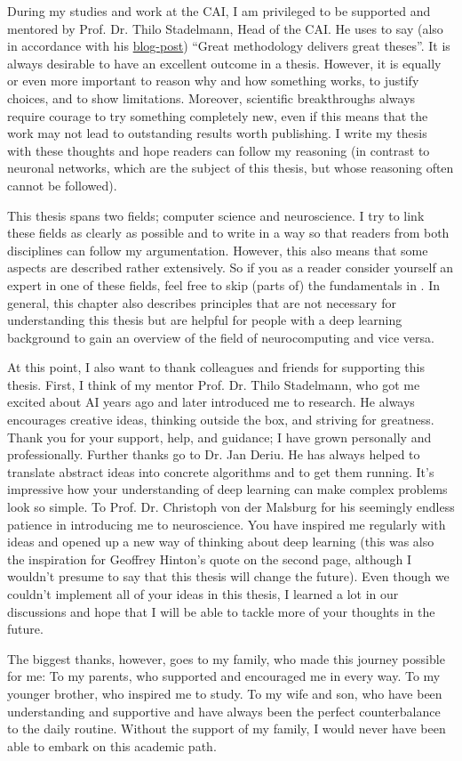 During my studies and work at the CAI, I am privileged to be supported and mentored by Prof. Dr. Thilo Stadelmann, Head of the CAI.
He uses to say (also in accordance with his \href{https://stdm.github.io/Great-methodology-delivers-great-theses/}{blog-post}) ``Great methodology delivers great theses''.
It is always desirable to have an excellent outcome in a thesis.
However, it is equally or even more important to reason why and how something works, to justify choices, and to show limitations.
Moreover, scientific breakthroughs always require courage to try something completely new, even if this means that the work may not lead to outstanding results worth publishing.
I write my thesis with these thoughts and hope readers can follow my reasoning (in contrast to neuronal networks, which are the subject of this thesis, but whose reasoning often cannot be followed).

This thesis spans two fields; computer science and neuroscience.
I try to link these fields as clearly as possible and to write in a way so that readers from both disciplines can follow my argumentation.
However, this also means that some aspects are described rather extensively.
So if you as a reader consider yourself an expert in one of these fields, feel free to skip (parts of) the fundamentals in .
In general, this chapter also describes principles that are not necessary for understanding this thesis but are helpful for people with a deep learning background to gain an overview of the field of neurocomputing and vice versa.

At this point, I also want to thank colleagues and friends for supporting this thesis.
First, I think of my mentor Prof. Dr. Thilo Stadelmann, who got me excited about AI years ago and later introduced me to research.
He always encourages creative ideas, thinking outside the box, and striving for greatness.
Thank you for your support, help, and guidance; I have grown personally and professionally.
Further thanks go to Dr. Jan Deriu. 
He has always helped to translate abstract ideas into concrete algorithms and to get them running.
It's impressive how your understanding of deep learning can make complex problems look so simple.
To Prof. Dr. Christoph von der Malsburg for his seemingly endless patience in introducing me to neuroscience.
You have inspired me regularly with ideas and opened up a new way of thinking about deep learning (this was also the inspiration for Geoffrey Hinton's quote on the second page, although I wouldn't presume to say that this thesis will change the future).
Even though we couldn't implement all of your ideas in this thesis, I learned a lot in our discussions and hope that I will be able to tackle more of your thoughts in the future.

The biggest thanks, however, goes to my family, who made this journey possible for me:
To my parents, who supported and encouraged me in every way.
To my younger brother, who inspired me to study.
To my wife and son, who have been understanding and supportive and have always been the perfect counterbalance to the daily routine.
Without the support of my family, I would never have been able to embark on this academic path.
\normalsize

